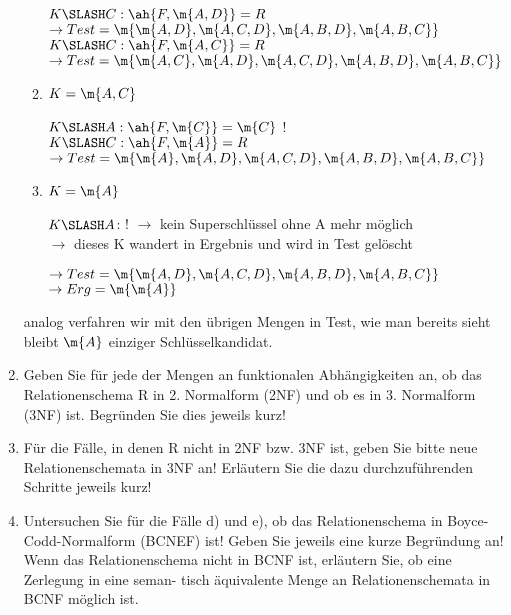\documentclass{bschlangaul-aufgabe}
\begin{document}
\begin{enumerate}
\begin{bAntwort}
\begin{enumerate}
$K \SLASH C: \ah{F, \m{A, D}} = R$\\
$\rightarrow Test = \m{\m{A, D}, \m{A, C, D}, \m{A, B, D}, \m{A, B, C}}$ \\

$K \SLASH C: \ah{F, \m{A, C}} = R$\\
$\rightarrow Test = \m{\m{A, C}, \m{A, D}, \m{A, C, D}, \m{A, B, D}, \m{A, B, C}}$ \\


\item $K = \m{A, C}$

$K \SLASH A: \ah{F, \m{C}} = \m{C}$ !\\

$K \SLASH C: \ah{F, \m{A}} = R$\\
$\rightarrow Test = \m{\m{A}, \m{A, D}, \m{A, C, D}, \m{A, B, D}, \m{A, B, C}}$ \\


\item $K = \m{A}$

$K \SLASH A$: ! $\rightarrow$ kein Superschlüssel ohne A mehr möglich\\
$\rightarrow$ dieses K wandert in Ergebnis und wird in Test gelöscht

$\rightarrow Test = \m{\m{A, D}, \m{A, C, D}, \m{A, B, D}, \m{A, B, C}}$ \\
$\rightarrow Erg = \m{\m{A}}$ \\
\end{enumerate}

analog verfahren wir mit den übrigen Mengen in Test, wie man bereits
sieht bleibt $\m{A}$ einziger Schlüsselkandidat.

\end{bAntwort}

\item Geben Sie für jede der Mengen an funktionalen Abhängigkeiten an,
ob das Relationenschema R in 2. Normalform (2NF) und ob es in 3.
Normalform (3NF) ist. Begründen Sie dies jeweils kurz!

\item Für die Fälle, in denen R nicht in 2NF bzw. 3NF ist, geben Sie
bitte neue Relationenschemata in 3NF an! Erläutern Sie die dazu
durchzuführenden Schritte jeweils kurz!

\item Untersuchen Sie für die Fälle d) und e), ob das Relationenschema
in Boyce-Codd-Normalform (BCNEF) ist! Geben Sie jeweils eine kurze
Begründung an! Wenn das Relationenschema nicht in BCNF ist, erläutern
Sie, ob eine Zerlegung in eine seman- tisch äquivalente Menge an
Relationenschemata in BCNF möglich ist.
\end{enumerate}
\end{document}
